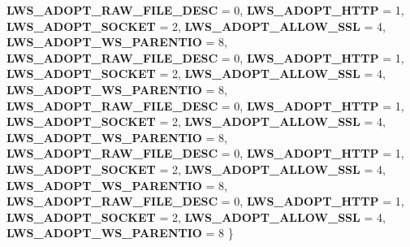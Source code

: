 \begin{DoxyCompactItemize}
{\bfseries L\+W\+S\+\_\+\+A\+D\+O\+P\+T\+\_\+\+R\+A\+W\+\_\+\+F\+I\+L\+E\+\_\+\+D\+E\+SC} = 0, 
{\bfseries L\+W\+S\+\_\+\+A\+D\+O\+P\+T\+\_\+\+H\+T\+TP} = 1, 
{\bfseries L\+W\+S\+\_\+\+A\+D\+O\+P\+T\+\_\+\+S\+O\+C\+K\+ET} = 2, 
\newline
{\bfseries L\+W\+S\+\_\+\+A\+D\+O\+P\+T\+\_\+\+A\+L\+L\+O\+W\+\_\+\+S\+SL} = 4, 
{\bfseries L\+W\+S\+\_\+\+A\+D\+O\+P\+T\+\_\+\+W\+S\+\_\+\+P\+A\+R\+E\+N\+T\+IO} = 8, 
{\bfseries L\+W\+S\+\_\+\+A\+D\+O\+P\+T\+\_\+\+R\+A\+W\+\_\+\+F\+I\+L\+E\+\_\+\+D\+E\+SC} = 0, 
{\bfseries L\+W\+S\+\_\+\+A\+D\+O\+P\+T\+\_\+\+H\+T\+TP} = 1, 
\newline
{\bfseries L\+W\+S\+\_\+\+A\+D\+O\+P\+T\+\_\+\+S\+O\+C\+K\+ET} = 2, 
{\bfseries L\+W\+S\+\_\+\+A\+D\+O\+P\+T\+\_\+\+A\+L\+L\+O\+W\+\_\+\+S\+SL} = 4, 
{\bfseries L\+W\+S\+\_\+\+A\+D\+O\+P\+T\+\_\+\+W\+S\+\_\+\+P\+A\+R\+E\+N\+T\+IO} = 8, 
{\bfseries L\+W\+S\+\_\+\+A\+D\+O\+P\+T\+\_\+\+R\+A\+W\+\_\+\+F\+I\+L\+E\+\_\+\+D\+E\+SC} = 0, 
\newline
{\bfseries L\+W\+S\+\_\+\+A\+D\+O\+P\+T\+\_\+\+H\+T\+TP} = 1, 
{\bfseries L\+W\+S\+\_\+\+A\+D\+O\+P\+T\+\_\+\+S\+O\+C\+K\+ET} = 2, 
{\bfseries L\+W\+S\+\_\+\+A\+D\+O\+P\+T\+\_\+\+A\+L\+L\+O\+W\+\_\+\+S\+SL} = 4, 
{\bfseries L\+W\+S\+\_\+\+A\+D\+O\+P\+T\+\_\+\+W\+S\+\_\+\+P\+A\+R\+E\+N\+T\+IO} = 8, 
\newline
{\bfseries L\+W\+S\+\_\+\+A\+D\+O\+P\+T\+\_\+\+R\+A\+W\+\_\+\+F\+I\+L\+E\+\_\+\+D\+E\+SC} = 0, 
{\bfseries L\+W\+S\+\_\+\+A\+D\+O\+P\+T\+\_\+\+H\+T\+TP} = 1, 
{\bfseries L\+W\+S\+\_\+\+A\+D\+O\+P\+T\+\_\+\+S\+O\+C\+K\+ET} = 2, 
{\bfseries L\+W\+S\+\_\+\+A\+D\+O\+P\+T\+\_\+\+A\+L\+L\+O\+W\+\_\+\+S\+SL} = 4, 
\newline
{\bfseries L\+W\+S\+\_\+\+A\+D\+O\+P\+T\+\_\+\+W\+S\+\_\+\+P\+A\+R\+E\+N\+T\+IO} = 8, 
{\bfseries L\+W\+S\+\_\+\+A\+D\+O\+P\+T\+\_\+\+R\+A\+W\+\_\+\+F\+I\+L\+E\+\_\+\+D\+E\+SC} = 0, 
{\bfseries L\+W\+S\+\_\+\+A\+D\+O\+P\+T\+\_\+\+H\+T\+TP} = 1, 
{\bfseries L\+W\+S\+\_\+\+A\+D\+O\+P\+T\+\_\+\+S\+O\+C\+K\+ET} = 2, 
\newline
{\bfseries L\+W\+S\+\_\+\+A\+D\+O\+P\+T\+\_\+\+A\+L\+L\+O\+W\+\_\+\+S\+SL} = 4, 
{\bfseries L\+W\+S\+\_\+\+A\+D\+O\+P\+T\+\_\+\+W\+S\+\_\+\+P\+A\+R\+E\+N\+T\+IO} = 8
 \}
\end{DoxyCompactItemize}
